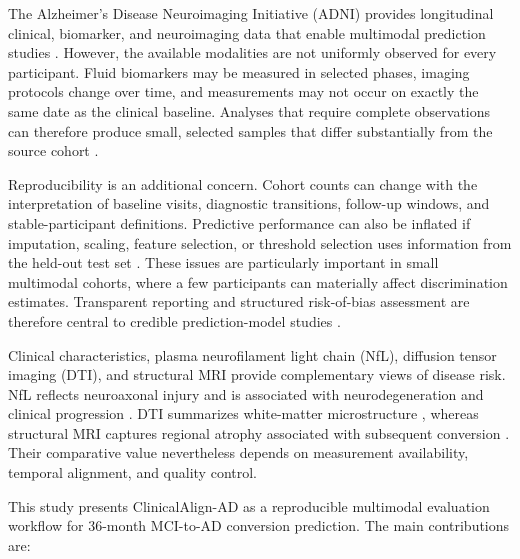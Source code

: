 \documentclass[preprint,12pt]{elsarticle}
\begin{document}
The Alzheimer's Disease Neuroimaging Initiative (ADNI) provides longitudinal clinical, biomarker, and neuroimaging data that enable multimodal prediction studies \cite{michaelw.weinerAlzheimersDiseaseNeuroimaging2017}. However, the available modalities are not uniformly observed for every participant. Fluid biomarkers may be measured in selected phases, imaging protocols change over time, and measurements may not occur on exactly the same date as the clinical baseline. Analyses that require complete observations can therefore produce small, selected samples that differ substantially from the source cohort \cite{multimodal2021early,michalgolovanevskyMultimodalAttentionbasedDeep2022}.

Reproducibility is an additional concern. Cohort counts can change with the interpretation of baseline visits, diagnostic transitions, follow-up windows, and stable-participant definitions. Predictive performance can also be inflated if imputation, scaling, feature selection, or threshold selection uses information from the held-out test set \cite{varoquauxMachineLearningMedical2022}. These issues are particularly important in small multimodal cohorts, where a few participants can materially affect discrimination estimates. Transparent reporting and structured risk-of-bias assessment are therefore central to credible prediction-model studies \cite{collinsTransparentReportingMultivariable2015,wolffPROBASTToolAssess2019}.

Clinical characteristics, plasma neurofilament light chain (NfL), diffusion tensor imaging (DTI), and structural MRI provide complementary views of disease risk. NfL reflects neuroaxonal injury and is associated with neurodegeneration and clinical progression \cite{mattssonAssociationPlasmaNeurofilament2017,lewczukPlasmaNeurofilamentLight2018,preischeSerumNeurofilamentDynamics2019}. DTI summarizes white-matter microstructure \cite{mielkeRegionallySpecificDiffusion2009,nirEffectivenessRegionalDTI2013}, whereas structural MRI captures regional atrophy associated with subsequent conversion \cite{jackPredictionADMRIBased1999,devanandHippocampalEntorhinalAtrophy2007,shannonl.risacherBaselineMRIPredictors2009}. Their comparative value nevertheless depends on measurement availability, temporal alignment, and quality control.

This study presents ClinicalAlign-AD as a reproducible multimodal evaluation workflow for 36-month MCI-to-AD conversion prediction. The main contributions are:
\end{document}
